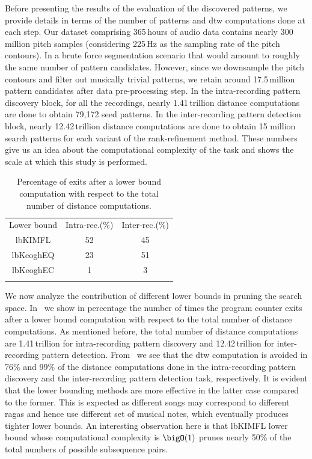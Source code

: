 Before presenting the results of the evaluation of the discovered patterns, we provide details in terms of the number of patterns and \gls{dtw} computations done at each step. Our dataset comprising 365\,hours of audio data contains nearly 300\,million pitch samples (considering 225\,Hz as the sampling rate of the pitch contours). In a brute force segmentation scenario that would amount to roughly the same number of pattern candidates. However, since we downsample the pitch contours and filter out musically trivial patterns, we retain around 17.5\,million pattern candidates after data pre-processing step. In the intra-recording pattern discovery block, for all the recordings, nearly 1.41\,trillion distance computations are done to obtain 79,172 seed patterns. In the inter-recording pattern detection block, nearly 12.42\,trillion distance computations are done to obtain 15 million search patterns for each variant of the rank-refinement method. These numbers give us an idea about the computational complexity of the task and shows the scale at which this study is performed.

\begin{table} 
	\begin{centering}
		\begin{tabular}{ c | c c }
			\tabletop
			Lower bound   	& Intra-rec.(\%)		&	Inter-rec.(\%) \\	
			\tablemid
			\acrshort{lbKIMFL}   	& 52	&	45 \\	
			\acrshort{lbKeoghEQ}   	& 23	&	51 \\
			\acrshort{lbKeoghEC}   		& 1	&	3 \\
			\tablebot
		\end{tabular}
		\caption[Percentage of exits after different lower bound computations]{Percentage of exits after a lower bound computation with respect to the total number of distance computations.}
		\label{tab:computationalStats}	
		\par \end{centering}	
\end{table}

We now analyze the contribution of different lower bounds in pruning the search space. In~ we show in percentage the number of times the program counter exits after a lower bound computation with respect to the total number of distance computations. As mentioned before, the total number of distance computations are 1.41\,trillion for intra-recording pattern discovery and 12.42\,trillion for inter-recording pattern detection. From~ we see that the \gls{dtw} computation is avoided in 76\% and 99\% of the distance computations done in the intra-recording pattern discovery and the inter-recording pattern detection task, respectively. It is evident that the lower bounding methods are more effective in the latter case compared to the former. This is expected as different songs may correspond to different \glspl{raga} and hence use different set of musical notes, which eventually produces tighter lower bounds. An interesting observation here is that \acrshort{lbKIMFL} lower bound whose computational complexity is $\bigO(1)$ prunes nearly 50\% of the total numbers of possible subsequence pairs. 

